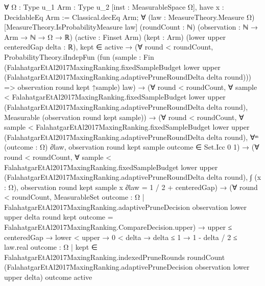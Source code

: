 \documentclass[10pt]{article}
\begin{document}
\begin{ReviewVerbatim}
∀ {Ω : Type u_1} {Arm : Type u_2} [inst : MeasurableSpace Ω],
  have x : DecidableEq Arm := Classical.decEq Arm;
  ∀ (law : MeasureTheory.Measure Ω) [MeasureTheory.IsProbabilityMeasure law] (roundCount : ℕ)
    (observation : ℕ → Arm → ℕ → Ω → ℝ) (active : Finset Arm) (kept : Arm) (lower upper centeredGap delta : ℝ),
    kept ∈ active →
      (∀ round < roundCount,
          ProbabilityTheory.iIndepFun
            (fun
                (sample :
                  Fin
                    (FalahatgarEtAl2017MaxingRanking.fixedSampleBudget lower upper
                      (FalahatgarEtAl2017MaxingRanking.adaptivePruneRoundDelta delta round))) =>
              observation round kept ↑sample)
            law) →
        (∀ round < roundCount,
            ∀
              sample <
                FalahatgarEtAl2017MaxingRanking.fixedSampleBudget lower upper
                  (FalahatgarEtAl2017MaxingRanking.adaptivePruneRoundDelta delta round),
              Measurable (observation round kept sample)) →
          (∀ round < roundCount,
              ∀
                sample <
                  FalahatgarEtAl2017MaxingRanking.fixedSampleBudget lower upper
                    (FalahatgarEtAl2017MaxingRanking.adaptivePruneRoundDelta delta round),
                ∀ᵐ (outcome : Ω) ∂law, observation round kept sample outcome ∈ Set.Icc 0 1) →
            (∀ round < roundCount,
                ∀
                  sample <
                    FalahatgarEtAl2017MaxingRanking.fixedSampleBudget lower upper
                      (FalahatgarEtAl2017MaxingRanking.adaptivePruneRoundDelta delta round),
                  ∫ (x : Ω), observation round kept sample x ∂law = 1 / 2 + centeredGap) →
              (∀ round < roundCount,
                  MeasurableSet
                    {outcome : Ω |
                      FalahatgarEtAl2017MaxingRanking.adaptivePruneDecision observation lower upper delta round kept
                          outcome =
                        FalahatgarEtAl2017MaxingRanking.CompareDecision.upper}) →
                upper ≤ centeredGap →
                  lower < upper →
                    0 < delta →
                      delta ≤ 1 →
                        1 - delta / 2 ≤
                          law.real
                            {outcome : Ω |
                              kept ∈
                                FalahatgarEtAl2017MaxingRanking.indexedPruneRounds roundCount
                                  (FalahatgarEtAl2017MaxingRanking.adaptivePruneDecision observation lower upper delta)
                                  outcome active}
\end{ReviewVerbatim}
\end{document}
